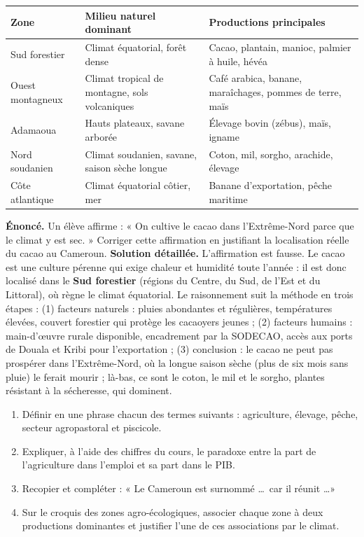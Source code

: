 \documentclass[11pt]{article}
\begin{document}
\begin{center}
\begin{tabularx}{\linewidth}{|l|X|X|}
\hline
\rowcolor{popblueL} \textbf{Zone} & \textbf{Milieu naturel dominant} & \textbf{Productions principales} \\
\hline
Sud forestier & Climat équatorial, forêt dense & Cacao, plantain, manioc, palmier à huile, hévéa \\
\hline
Ouest montagneux & Climat tropical de montagne, sols volcaniques & Café arabica, banane, maraîchages, pommes de terre, maïs \\
\hline
Adamaoua & Hauts plateaux, savane arborée & Élevage bovin (zébus), maïs, igname \\
\hline
Nord soudanien & Climat soudanien, savane, saison sèche longue & Coton, mil, sorgho, arachide, élevage \\
\hline
Côte atlantique & Climat équatorial côtier, mer & Banane d'exportation, pêche maritime \\
\hline
\end{tabularx}
\end{center}

\begin{exoresolu}
\textbf{Énoncé.} Un élève affirme : « On cultive le cacao dans l'Extrême-Nord parce que le climat y est sec. » Corriger cette affirmation en justifiant la localisation réelle du cacao au Cameroun.
\tcblower
\textbf{Solution détaillée.} L'affirmation est fausse. Le cacao est une culture pérenne qui exige chaleur et humidité toute l'année : il est donc localisé dans le \textbf{Sud forestier} (régions du Centre, du Sud, de l'Est et du Littoral), où règne le climat équatorial. Le raisonnement suit la méthode en trois étapes : (1) facteurs naturels : pluies abondantes et régulières, températures élevées, couvert forestier qui protège les cacaoyers jeunes ; (2) facteurs humains : main-d'œuvre rurale disponible, encadrement par la SODECAO, accès aux ports de Douala et Kribi pour l'exportation ; (3) conclusion : le cacao ne peut pas prospérer dans l'Extrême-Nord, où la longue saison sèche (plus de six mois sans pluie) le ferait mourir ; là-bas, ce sont le coton, le mil et le sorgho, plantes résistant à la sécheresse, qui dominent.
\end{exoresolu}

\begin{exercice}
\begin{enumerate}
\item Définir en une phrase chacun des termes suivants : agriculture, élevage, pêche, secteur agropastoral et piscicole.
\item Expliquer, à l'aide des chiffres du cours, le paradoxe entre la part de l'agriculture dans l'emploi et sa part dans le PIB.
\item Recopier et compléter : « Le Cameroun est surnommé \ldots\ car il réunit \ldots »
\item Sur le croquis des zones agro-écologiques, associer chaque zone à deux productions dominantes et justifier l'une de ces associations par le climat.
\end{enumerate}
\end{exercice}
\end{document}
